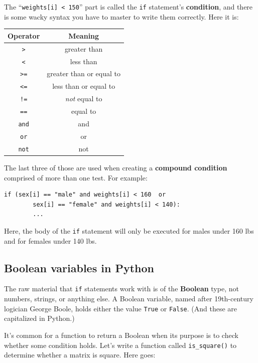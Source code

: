 The ``\texttt{weights[i] < 150}'' part is called the \texttt{if} statement's
\textbf{condition}, and there is some wacky syntax you have to master to write
them correctly. Here it is:

\begin{center}
\begin{tabular}{c|c}
Operator & Meaning \\
\hline
\texttt{>} & greater than \\
\hline
\texttt{<} & less than \\
\hline
\texttt{>=} & greater than or equal to \\
\hline
\texttt{<=} & less than or equal to \\
\hline
\texttt{!=} & \textit{not} equal to \\
\hline
\texttt{==} & equal to \\
\hline
\texttt{and} & and \\
\hline
\texttt{or} & or \\
\hline
\texttt{not} & not \\
\end{tabular}
\end{center}

The last three of those are used when creating a \textbf{compound condition}
comprised of more than one test. For example:

\begin{Verbatim}[fontsize=\small,samepage=true,frame=single,framesep=3mm]
    if (sex[i] == "male" and weights[i] < 160  or
        sex[i] == "female" and weights[i] < 140):
        ...
\end{Verbatim}

Here, the body of the \texttt{if} statement will only be executed for males
under 160 lbs and for females under 140 lbs.

\subsection*{Boolean variables in Python}

The raw material that \texttt{if} statements work with is of the
\textbf{Boolean} type, not numbers, strings, or anything else. A Boolean
variable, named after 19th-century logician George Boole, holds either the
value \texttt{True} or \texttt{False}. (And these are capitalized in Python.)

It's common for a function to return a Boolean when its purpose is to check
whether some condition holds. Let's write a function called
\texttt{is\_square()} to determine whether a matrix is square. Here goes:

